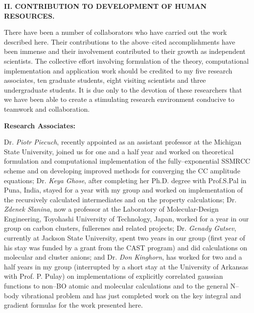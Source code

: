 \vspace{4mm}

\noindent
{\bf II.  CONTRIBUTION TO DEVELOPMENT OF HUMAN RESOURCES.}

There have been a number of collaborators who 
have carried out the work described here. Their
contributions to the above--cited accomplishments have 
been immense and their involvement contributed to their
growth as independent scientists. The collective 
effort involving formulation of the theory, computational
implementation and application work should be credited 
to my five research associates, ten graduate students,
eight visiting scientists and three undergraduate students.  
It is due only to the devotion of these researchers that
we have been able to create a stimulating research environment 
conducive to teamwork and collaboration.

\vspace{2mm}

\noindent
{\bf Research Associates:}

Dr. {\em Piotr Piecuch}, recently appointed as an 
assistant professor at the Michigan State University, joined us for
one and a half year and worked on theoretical formulation and 
computational implementation of the fully--exponential
SSMRCC scheme and on developing improved 
methods for converging the CC amplitude equations;  
Dr. {\em Keya Ghose}, 
after completing her Ph.D. degree with Prof.S.Pal in Puna, India,
stayed for a year with my group and 
worked on implementation of the recursively calculated
intermediates and on the property calculations;  
Dr. {\em  Zdenek Slanina}, 
now a professor at the Laboratory
of Molecular-Design Engineering,
Toyohashi University of Technology, Japan,
worked for a year in our group on carbon clusters, fullerenes and
related projects;  
Dr. {\em Genady Gutsev}, 
currently
at Jackson State University, 
spent two years in our group (first year of his stay was
funded by a grant from the CAST program) and did 
calculations on molecular and cluster anions; 
and Dr. {\em Don Kinghorn}, 
has worked for two and a half years in my group
(interrupted by
a short stay at the University of Arkansas with Prof. P. Pulay) 
on implementations of explicitly correlated gaussian functions
to non--BO atomic and molecular calculations and 
to the general N--body vibrational problem and has just completed
work on the key integral and gradient formulas for the work 
presented here.

\vspace{2mm}

